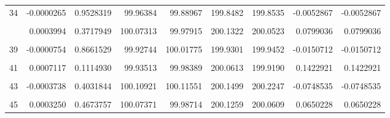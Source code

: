 \documentclass[a4paper]{tufte-handout}
\begin{document}
\begin{table}
{\begin{tabular}[t]{rrrrrrrrr}
34 & -0.0000265 & 0.9528319 & 99.96384 & 99.88967 & 199.8482 & 199.8535 & -0.0052867 & -0.0052867\\
\cellcolor{gray!6}{35} & \cellcolor{gray!6}{-0.0005338} & \cellcolor{gray!6}{0.2326680} & \cellcolor{gray!6}{99.99355} & \cellcolor{gray!6}{100.02165} & \cellcolor{gray!6}{199.9084} & \cellcolor{gray!6}{200.0152} & \cellcolor{gray!6}{-0.1067593} & \cellcolor{gray!6}{-0.1067593}\\
\addlinespace
36 & 0.0003994 & 0.3717949 & 100.07313 & 99.97915 & 200.1322 & 200.0523 & 0.0799036 & 0.0799036\\
\cellcolor{gray!6}{37} & \cellcolor{gray!6}{0.0000662} & \cellcolor{gray!6}{0.8822869} & \cellcolor{gray!6}{100.09695} & \cellcolor{gray!6}{100.02205} & \cellcolor{gray!6}{200.1323} & \cellcolor{gray!6}{200.1190} & \cellcolor{gray!6}{0.0132517} & \cellcolor{gray!6}{0.0132517}\\
39 & -0.0000754 & 0.8661529 & 99.92744 & 100.01775 & 199.9301 & 199.9452 & -0.0150712 & -0.0150712\\
\cellcolor{gray!6}{40} & \cellcolor{gray!6}{0.0000553} & \cellcolor{gray!6}{0.9015342} & \cellcolor{gray!6}{100.00996} & \cellcolor{gray!6}{100.08630} & \cellcolor{gray!6}{200.1073} & \cellcolor{gray!6}{200.0963} & \cellcolor{gray!6}{0.0110715} & \cellcolor{gray!6}{0.0110715}\\
41 & 0.0007117 & 0.1114930 & 99.93513 & 99.98389 & 200.0613 & 199.9190 & 0.1422921 & 0.1422921\\
\addlinespace
\cellcolor{gray!6}{42} & \cellcolor{gray!6}{0.0007097} & \cellcolor{gray!6}{0.1125051} & \cellcolor{gray!6}{100.03694} & \cellcolor{gray!6}{100.05762} & \cellcolor{gray!6}{200.2366} & \cellcolor{gray!6}{200.0946} & \cellcolor{gray!6}{0.1420157} & \cellcolor{gray!6}{0.1420157}\\
43 & -0.0003738 & 0.4031844 & 100.10921 & 100.11551 & 200.1499 & 200.2247 & -0.0748535 & -0.0748535\\
\cellcolor{gray!6}{44} & \cellcolor{gray!6}{0.0001112} & \cellcolor{gray!6}{0.8035807} & \cellcolor{gray!6}{99.91321} & \cellcolor{gray!6}{99.97610} & \cellcolor{gray!6}{199.9115} & \cellcolor{gray!6}{199.8893} & \cellcolor{gray!6}{0.0222335} & \cellcolor{gray!6}{0.0222335}\\
45 & 0.0003250 & 0.4673757 & 100.07371 & 99.98714 & 200.1259 & 200.0609 & 0.0650228 & 0.0650228\\
\bottomrule
\end{tabular}}
\end{table}
\end{document}
